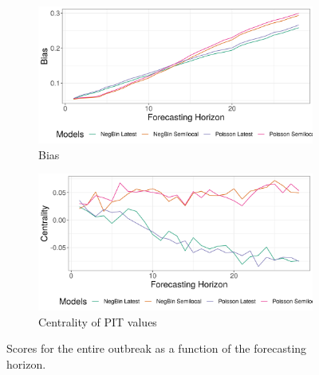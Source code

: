 \begin{figure}[H]
\begin{subfigure}{0.5\textwidth}
  \centering
  \includegraphics[width=\linewidth]{../output/Kyondo_bias.png}  
  \caption{Bias}
  \label{fig:sub-third}
\end{subfigure}
\begin{subfigure}{0.5\textwidth}
  \centering
  \includegraphics[width=\linewidth]{../output/Kyondo_centrality.png}  
  \caption{Centrality of PIT values}
  \label{fig:nat_scores_4}
\end{subfigure}
  \caption{Scores for the entire outbreak as a function of the forecasting horizon.}

  \label{fig:nat_scores}
\end{figure}
